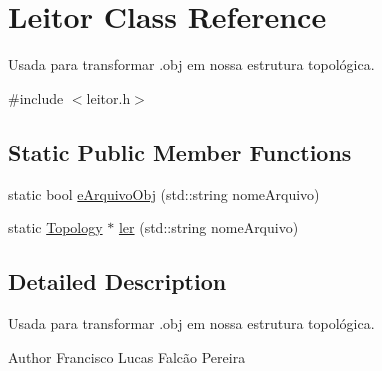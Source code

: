 \hypertarget{class_leitor}{\section{Leitor Class Reference}
\label{class_leitor}
}


Usada para transformar .obj em nossa estrutura topológica.  




{\ttfamily \#include $<$leitor.\-h$>$}

\subsection*{Static Public Member Functions}
\begin{DoxyCompactItemize}
\item 
static bool \hyperlink{class_leitor_a088b33a1761a473f3bd0acfaa5ffb6b7}{e\-Arquivo\-Obj} (std\-::string nome\-Arquivo)
\item 
static \hyperlink{topology_8h_a36084a4504e685f7634f504378160ed9}{Topology} $\ast$ \hyperlink{class_leitor_a509cf48ca55b02f61db663ecf5da8305}{ler} (std\-::string nome\-Arquivo)
\end{DoxyCompactItemize}


\subsection{Detailed Description}
Usada para transformar .obj em nossa estrutura topológica. 

\begin{DoxyAuthor}{Author}
Francisco Lucas Falcão Pereira 
\end{DoxyAuthor}



